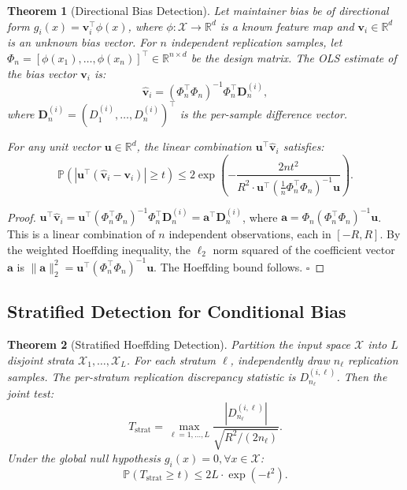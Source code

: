 \documentclass[11pt,a4paper]{article}
\newtheorem{theorem}{Theorem}[section]
\theoremstyle{definition}
\newcommand{\R}{\mathbb{R}}
\newcommand{\Prob}{\mathbb{P}}
\begin{document}
\begin{theorem}[Directional Bias Detection]
\label{thm:directional_bias}
Let maintainer bias be of directional form $g_i(x) = \mathbf{v}_i^{\top} \phi(x)$, where $\phi: \mathcal{X} \to \R^d$ is a known feature map and $\mathbf{v}_i \in \R^d$ is an unknown bias vector. For $n$ independent replication samples, let $\Phi_n = [\phi(x_1), \ldots, \phi(x_n)]^{\top} \in \R^{n \times d}$ be the design matrix. The OLS estimate of the bias vector $\mathbf{v}_i$ is:
\begin{equation}\label{eq:ols_v}
    \hat{\mathbf{v}}_i = (\Phi_n^{\top}\Phi_n)^{-1}\Phi_n^{\top} \mathbf{D}_n^{(i)},
\end{equation}
where $\mathbf{D}_n^{(i)} = (D_1^{(i)}, \ldots, D_n^{(i)})^{\top}$ is the per-sample difference vector.

For any unit vector $\mathbf{u} \in \R^d$, the linear combination $\mathbf{u}^{\top}\hat{\mathbf{v}}_i$ satisfies:
\begin{equation}\label{eq:directional_hoeffding}
    \Prob\left(|\mathbf{u}^{\top}(\hat{\mathbf{v}}_i - \mathbf{v}_i)| \geq t\right) \leq 2\exp\left(-\frac{2n t^2}{R^2 \cdot \mathbf{u}^{\top}(\frac{1}{n}\Phi_n^{\top}\Phi_n)^{-1}\mathbf{u}}\right).
\end{equation}
\end{theorem}

\begin{proof}
$\mathbf{u}^{\top}\hat{\mathbf{v}}_i = \mathbf{u}^{\top}(\Phi_n^{\top}\Phi_n)^{-1}\Phi_n^{\top}\mathbf{D}_n^{(i)} = \mathbf{a}^{\top}\mathbf{D}_n^{(i)}$, where $\mathbf{a} = \Phi_n(\Phi_n^{\top}\Phi_n)^{-1}\mathbf{u}$. This is a linear combination of $n$ independent observations, each in $[-R, R]$. By the weighted Hoeffding inequality, the $\ell_2$ norm squared of the coefficient vector $\mathbf{a}$ is $\|\mathbf{a}\|_2^2 = \mathbf{u}^{\top}(\Phi_n^{\top}\Phi_n)^{-1}\mathbf{u}$. The Hoeffding bound follows. \hfill$\square$
\end{proof}

\subsection{Stratified Detection for Conditional Bias}

\begin{theorem}[Stratified Hoeffding Detection]
\label{thm:stratified}
Partition the input space $\mathcal{X}$ into $L$ disjoint strata $\mathcal{X}_1, \ldots, \mathcal{X}_L$. For each stratum $\ell$, independently draw $n_\ell$ replication samples. The per-stratum replication discrepancy statistic is $D_{n_\ell}^{(i,\ell)}$. Then the joint test:
\begin{equation}\label{eq:stratified_test}
    T_{\text{strat}} = \max_{\ell=1,\ldots,L} \frac{|D_{n_\ell}^{(i,\ell)}|}{\sqrt{R^2 / (2n_\ell)}}.
\end{equation}
Under the global null hypothesis $g_i(x) = 0, \forall x \in \mathcal{X}$:
\begin{equation}\label{eq:stratified_bound}
    \Prob\left(T_{\text{strat}} \geq t\right) \leq 2L \cdot \exp\left(-t^2\right).
\end{equation}
\end{theorem}
\end{document}
